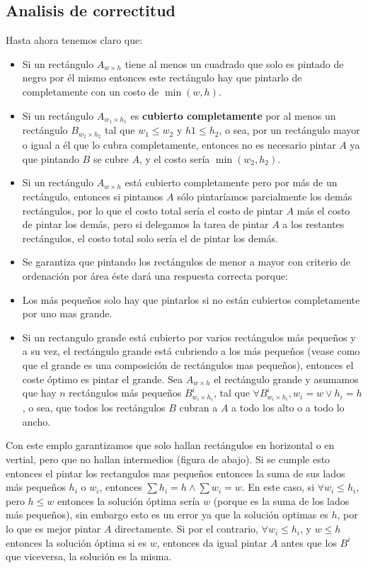 \documentclass{article}
\begin{document}
\subsection{Analisis de correctitud}
	Hasta ahora tenemos claro que:
	\begin{itemize}
	
\item Si un rectángulo $A_{w \times h}$ tiene al menos un cuadrado que solo es pintado de negro por él mismo entonces este rectángulo hay que pintarlo de completamente con un costo de $\min {(w, h)}$.

\item Si un rectángulo $A_{w_1 \times h_1}$ es \textbf{cubierto completamente} por al menos un rectángulo $B_{ w_2 \times h_2}$ tal que $w_1 \leq w_2$ y $h1 \leq h_2$, o sea, por un rectángulo mayor o igual a él que lo cubra completamente, entonces no es necesario pintar $A$ ya que pintando $B$ se cubre $A$, y el costo sería $\min{(w_2, h_2)}$.
\item Si un rectángulo $A_{w \times h}$ está cubierto completamente pero por más de un rectángulo, entonces si pintamos $A$ sólo pintaríamos parcialmente los demás rectángulos, por lo que el costo total sería el costo de pintar $A$ más el costo de pintar los demás, pero si delegamos la tarea de pintar $A$ a los restantes rectángulos, el costo total solo sería el de pintar los demás.
\item Se garantiza que pintando los rectángulos de menor a mayor con criterio de ordenación por área éste dará una respuesta correcta porque:
  
\item Los más pequeños solo hay que pintarlos si no están cubiertos completamente por uno mas grande.
\item Si un rectangulo grande está cubierto por varios rectángulos más pequeños y a su vez, el rectángulo grande está cubriendo a los más pequeños (vease como que el grande es una composición de rectángulos mas pequeños), entonces el coste óptimo es pintar el grande. Sea $A_{w \times h}$ el rectángulo grande y asumamos que hay $n$ rectángulos más pequeños $B^{i}_{w_i \times h_i}$, tal que $\forall B^{i}_{w_i \times h_i}, w_i = w \lor h_i = h$, o sea, que todos los rectángulos $B$ cubran a $A$ a todo los alto o a todo lo ancho. 
  
  \end{itemize}

    Con este emplo garantizamos que solo hallan rectángulos en horizontal o en vertial, pero que no hallan intermedios (figura de abajo). Si se cumple esto entonces el pintar los rectangulos mas pequeños entonces la suma de sus lados más pequeños $h_i$ o $w_i$, entonces $\sum{h_i} = h \land \sum{w_i} = w$. En este caso, si $\forall w_i \leq h_i$, pero $h \leq w$ entonces la solución óptima sería $w$ (porque es la suma de los lados más pequeños), sin embargo esto es un error ya que la solución optimas es $h$, por lo que es mejor pintar $A$ directamente.
    Si por el contrario, $\forall w_i \leq h_i$, y $w \leq h$ entonces la solución óptima si es $w$, entonces da igual pintar $A$ antes que los $B^{i}$ que viceversa, la solución es la misma.
  
\end{document}
